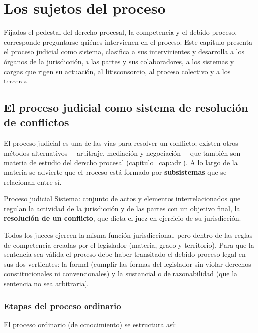 \documentclass[12pt,oneside]{book}
\begin{document}
\chapter{Los sujetos del proceso}
\label{cap:sujetos}

Fijados el pedestal del derecho procesal, la competencia y el debido proceso, corresponde preguntarse quiénes intervienen en el proceso. Este capítulo presenta el proceso judicial como sistema, clasifica a sus intervinientes y desarrolla a los órganos de la jurisdicción, a las partes y sus colaboradores, a los sistemas y cargas que rigen su actuación, al litisconsorcio, al proceso colectivo y a los terceros.

\section{El proceso judicial como sistema de resolución de conflictos}

El proceso judicial es una de las vías para resolver un conflicto; existen otros métodos alternativos ---arbitraje, mediación y negociación--- que también son materia de estudio del derecho procesal (capítulo~\ref{cap:adr}). A lo largo de la materia se advierte que el proceso está formado por \textbf{subsistemas} que se relacionan entre sí.

\begin{definition}{Proceso judicial}
Sistema: conjunto de actos y elementos interrelacionados que regulan la actividad de la jurisdicción y de las partes con un objetivo final, la \textbf{resolución de un conflicto}, que dicta el juez en ejercicio de su jurisdicción.
\end{definition}

Todos los jueces ejercen la misma función jurisdiccional, pero dentro de las reglas de competencia creadas por el legislador (materia, grado y territorio). Para que la sentencia sea válida el proceso debe haber transitado el debido proceso legal en sus dos vertientes: la formal (cumplir las formas del legislador sin violar derechos constitucionales ni convencionales) y la sustancial o de razonabilidad (que la sentencia no sea arbitraria).

\subsection{Etapas del proceso ordinario}

El proceso ordinario (de conocimiento) se estructura así:
\end{document}
